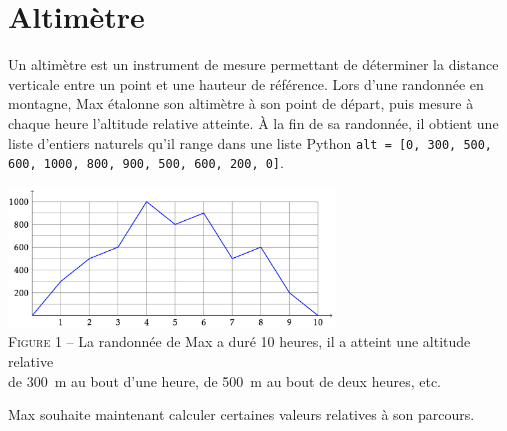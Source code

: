 \documentclass{magnolia}
\begin{document}

\section{Altimètre}
Un altimètre est un instrument de mesure permettant de déterminer la distance verticale entre un
point et une hauteur de référence. Lors d'une randonnée en montagne, Max étalonne son altimètre
à son point de départ, puis mesure à chaque heure l'altitude relative atteinte. À la fin de sa
randonnée, il obtient une liste d'entiers naturels qu'il range dans une liste Python 
\verb!alt = [0, 300, 500, 600, 1000, 800, 900, 500, 600, 200, 0]!. 

\begin{center}
\includegraphics[width=0.65\textwidth]{../../commun/images/python-tp-altimetre}\\
\textsc{Figure 1} -- La randonnée de Max a duré 10 heures, il a atteint une
altitude relative\\ de 300~m au bout d'une heure, de 500~m au bout de deux heures, etc.
\end{center}

Max souhaite maintenant calculer certaines valeurs relatives à son parcours.
\end{document}
